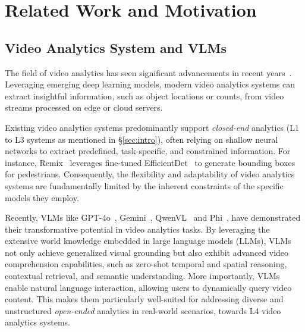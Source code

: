 \section{Related Work and Motivation}
\label{sec:motivation}

\subsection{Video Analytics System and VLMs}
\label{subsec:vas_vlm}



The field of video analytics has seen significant advancements in recent years~\cite{khani2023recl, bhardwaj2022ekya, zhang2024vulcan, padmanabhan2023gemel, lu2022turbo, sivaraman2024gemino, zhang2021sensei, jain20sec}. Leveraging emerging deep learning models, modern video analytics systems can extract insightful information, such as object locations or counts, from video streams processed on edge or cloud servers. 



Existing video analytics systems predominantly support \emph{closed-end} analytics (L1 to L3 systems as mentioned in \S\ref{sec:intro}), often relying on shallow neural networks to extract predefined, task-specific, and constrained information. For instance, Remix~\cite{remix_mobicom_21} leverages fine-tuned EfficientDet~\cite{tan2020efficientdet} to generate bounding boxes for pedestrians. Consequently, the flexibility and adaptability of video analytics systems are fundamentally limited by the inherent constraints of the specific models they employ.

Recently, VLMs like GPT-4o~\cite{achiam2023gpt}, Gemini~\cite{team2023gemini,team2024gemini}, QwenVL~\cite{wang2024qwen2,bai2025qwen2_5} and Phi~\cite{abdin2024phi3,abdin2024phi4,abouelenin2025phi4mini}, have demonstrated their transformative potential in video analytics tasks. By leveraging the extensive world knowledge embedded in large language models (LLMs), VLMs not only achieve generalized visual grounding but also exhibit advanced video comprehension capabilities, such as zero-shot temporal and spatial reasoning, contextual retrieval, and semantic understanding. More importantly, VLMs enable natural language interaction, allowing users to dynamically query video content. This makes them particularly well-suited for addressing diverse and unstructured \emph{open-ended} analytics in real-world scenarios, towards L4 video analytics systems.







